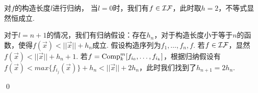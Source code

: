 \label{1.2}
\begin{pf} \rm 
    对$f$的构造长度$l$进行归纳，
    当$l=0$时，我们有$f\in\mathcal{IF}$，此时取$h=2$，不等式显然恒成立.
    
    对于$l=n+1$的情况，我们有归纳假设：存在$h_n$，对于构造长度小于等于$n$的函数，使得$f(\vec{x})<||\vec{x}||+h_n$成立. 假设构造序列为$f_1,\dots,f_n,f$. 若$f\in\mathcal{IF}$，显然$f(\vec{x})<||\vec{x}||+h_n+1$. 若$f=\mathrm{Comp}_k^m[f_{i_0},\dots,f_{i_k}]$，根据归纳假设有$f(\vec{x})<max\{f_{i_j}(\vec{x})\}+h_n<||\vec{x}||+2h_n$，此时我们找到了$h_{n+1}=2h_n$.

    \qed
\end{pf}
